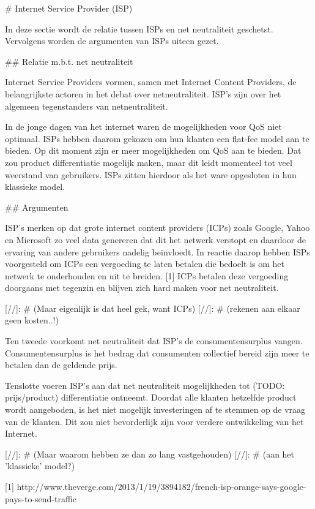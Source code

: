 # Internet Service Provider (ISP)

In deze sectie wordt de relatie tussen ISPs en net neutraliteit geschetst. Vervolgens worden de argumenten van ISPs uiteen gezet.

## Relatie m.b.t. net neutraliteit

Internet Service Providers vormen, samen met Internet Content Providers, de belangrijkste actoren in het debat over netneutraliteit. ISP's zijn over het algemeen tegenstanders van netneutraliteit.

In de jonge dagen van het internet waren de mogelijkheden voor QoS niet optimaal. ISPs hebben daarom gekozen om hun klanten een flat-fee model aan te bieden. Op dit moment zijn er meer mogelijkheden om QoS aan te bieden. Dat zou product differentiatie mogelijk maken, maar dit leidt momenteel tot veel weerstand van gebruikers. ISPs zitten hierdoor als het ware opgesloten in hun klassieke model.

## Argumenten

ISP's merken op dat grote internet content providers (ICPs) zoals Google, Yahoo en Microsoft zo veel data genereren dat dit het netwerk verstopt en daardoor de ervaring van andere
gebruikers nadelig beïnvloedt. In reactie daarop hebben ISPs voorgesteld om ICPs een vergoeding te laten betalen die bedoelt is om het netwerk te onderhouden en uit te breiden. [1] ICPs betalen deze vergoeding doorgaans met tegenzin en blijven zich hard maken voor net neutraliteit.

[//]: # (Maar eigenlijk is dat heel gek, want ICPs)
[//]: # (rekenen aan elkaar geen kosten..!)

Ten tweede voorkomt net neutraliteit dat ISP's de consumentensurplus vangen. Consumentensurplus is het bedrag dat consumenten collectief bereid zijn meer te betalen dan de geldende prijs.

Tenslotte voeren ISP's aan dat net neutraliteit mogelijkheden tot (TODO: prijs/product) differentiatie ontneemt. Doordat alle klanten hetzelfde product wordt aangeboden, is het niet mogelijk investeringen af te stemmen op de vraag van de klanten. Dit zou niet bevorderlijk zijn voor verdere ontwikkeling van het Internet.

[//]: # (Maar waarom hebben ze dan zo lang vastgehouden)
[//]: # (aan het 'klassieke' model?)



[1] http://www.theverge.com/2013/1/19/3894182/french-isp-orange-says-google-pays-to-send-traffic